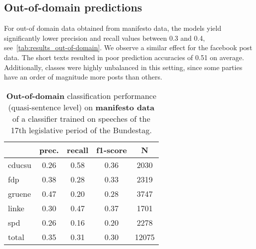 \documentclass[11pt]{article}
\begin{document}
\subsection{Out-of-domain predictions}
For out-of domain data obtained from manifesto data, the models yield significantly lower precision and recall values between 0.3 and 0.4, see~\autoref{tab:results_out-of-domain}. We observe a similar effect for the facebook post data. The short texts resulted in poor prediction accuracies of 0.51 on average. Additionally, classes were highly unbalanced in this setting, since some parties have an order of magnitude more posts than others.


\begin{table}[t]
\caption{
\label{tab:results_out-of-domain}
{\bf Out-of-domain} classification performance (quasi-sentence level) on {\bf manifesto data} of a classifier trained on speeches of the 17th legislative period of the Bundestag.
}

\begin{center}
\begin{tabular}{lcccc}
    &         prec.    &recall &  f1-score  & N  \\
\hline \hline
    cducsu    &   0.26   &   0.58   &   0.36    &   2030 \\
    fdp    &   0.38   &   0.28   &   0.33    &   2319 \\
     gruene   &    0.47    &  0.20   &   0.28    &  3747\\
      linke     &  0.30  &    0.47    &  0.37    &   1701\\
        spd     &  0.26  &    0.16   &   0.20    &   2278\\
\hline
total    &   0.35  &    0.31  &    0.30   &   12075\\
%
\end{tabular}
\end{center}

\end{table}
\end{document}
